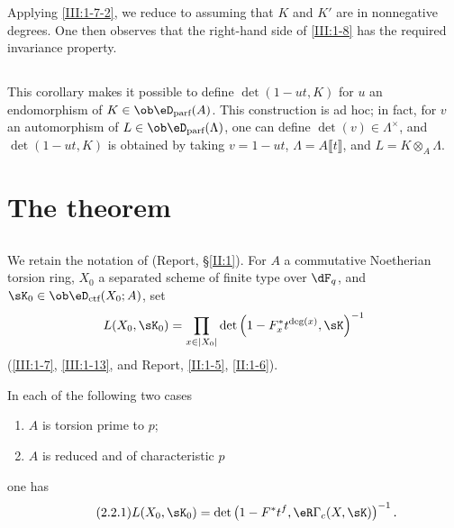 \documentclass[oneside]{book}
\begin{document}
Applying \ref{III:1-7-2}, we reduce to assuming that $K$ and $K'$ are in
nonnegative degrees. One then observes that the right-hand side of
\ref{III:1-8} has the required invariance property.






\subsection{}\label{III:1-14}

This corollary makes it possible to define $\det(1-u t,K)$ for $u$ an
endomorphism of $K\in \ob\eD_\text{parf}(A)$. This construction is ad hoc; in
fact, for $v$ an automorphism of $L\in\ob\eD_\text{parf}(\Lambda)$, one can
define $\det(v)\in\Lambda^\times$, and $\det(1-u t,K)$ is obtained by taking
$v=1-u t$, $\Lambda=A\llbracket t\rrbracket$, and
$L=K\otimes_A\Lambda$.









\section{The theorem}\label{III:2}






\subsection{}\label{III:2-1}

We retain the notation of (Report, \S\ref{II:1}). For $A$ a commutative
Noetherian torsion ring, $X_0$ a separated scheme of finite type over
$\dF_q$, and $\sK_0\in\ob\eD_\text{ctf}(X_0;A)$, set
\[
  L(X_0,\sK_0) = \prod_{x\in |X_0|} \det\left(1-F_x^* t^{\deg(x)}, \sK\right)^{-1}
\]
(\ref{III:1-7}, \ref{III:1-13}, and Report, \ref{II:1-5}, \ref{II:1-6}).





\begin{theorem_}\label{III:2-2}
In each of the following two cases
\begin{enumerate}[\indent a)]
  \item $A$ is torsion prime to $p$;
  \item $A$ is reduced and of characteristic $p$
\end{enumerate}
one has
\begin{equation*}\tag{2.2.1}\label{III:eq:2-2-1}
  L(X_0,\sK_0) = \det\left(1-F^* t^f, \eR\Gamma_c(X,\sK)\right)^{-1} \text{.}
\end{equation*}
\end{theorem_}
\end{document}
